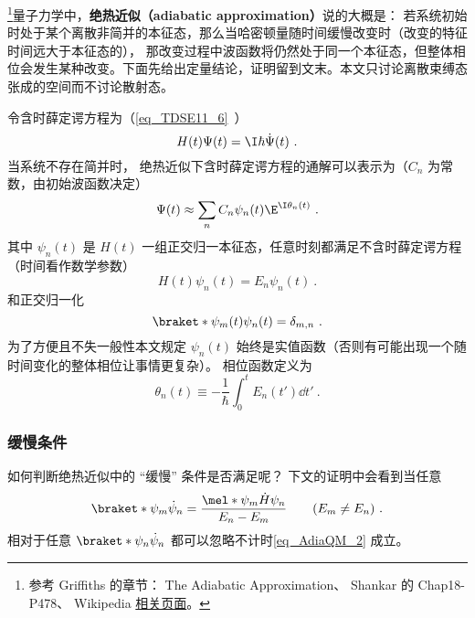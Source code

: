 
\begin{issues}
\issueTODO
\end{issues}


\footnote{参考 Griffiths\cite{GriffE} 的章节： The Adiabatic Approximation、 Shankar\cite{Shankar} 的 Chap18-P478、 Wikipedia \href{https://en.wikipedia.org/wiki/Adiabatic_theorem}{相关页面}。}量子力学中，\textbf{绝热近似（adiabatic approximation）}说的大概是： 若系统初始时处于某个离散非简并的本征态，那么当哈密顿量随时间缓慢改变时（改变的特征时间远大于本征态的）， 那改变过程中波函数将仍然处于同一个本征态，但整体相位会发生某种改变。下面先给出定量结论，证明留到文末。本文只讨论离散束缚态张成的空间而不讨论散射态。

令含时薛定谔方程为（\autoref{eq_TDSE11_6}~）
\begin{equation}\label{eq_AdiaQM_13}
H(t)\Psi(t) = \I\hbar\dot\Psi(t)~.
\end{equation}
当系统不存在简并时， 绝热近似下含时薛定谔方程的通解可以表示为（$C_n$ 为常数，由初始波函数决定）
\begin{equation}\label{eq_AdiaQM_2}
\Psi(t) \approx \sum_n C_n \psi_n(t) \E^{\I\theta_n(t)}~.
\end{equation}
其中 $\psi_n(t)$ 是 $H(t)$ 一组正交归一本征态，任意时刻都满足不含时薛定谔方程（时间看作数学参数）
\begin{equation}\label{eq_AdiaQM_3}
H(t)\psi_n(t) = E_n\psi_n(t)~.
\end{equation}
和正交归一化
\begin{equation}\label{eq_AdiaQM_6}
\braket*{\psi_m(t)}{\psi_n(t)} = \delta_{m,n}~.
\end{equation}
为了方便且不失一般性本文规定 $\psi_n(t)$ 始终是实值函数（否则有可能出现一个随时间变化的整体相位让事情更复杂）。 相位函数定义为
\begin{equation}\label{eq_AdiaQM_8}
\theta_n(t) \equiv -\frac{1}{\hbar} \int_0^t E_n(t')\dd{t'}~.
\end{equation}

\subsubsection{缓慢条件}
如何判断绝热近似中的 “缓慢” 条件是否满足呢？ 下文的证明中会看到当任意
\begin{equation}\label{eq_AdiaQM_11}
\braket*{\psi_m}{\dot\psi_n} = \frac{\mel*{\psi_m}{\dot H}{\psi_n}}{E_n-E_m} \qquad (E_m\ne E_n)~.
\end{equation}
相对于任意 $\braket*{\psi_n}{\dot\psi_n}$ 都可以忽略不计时\autoref{eq_AdiaQM_2} 成立。

